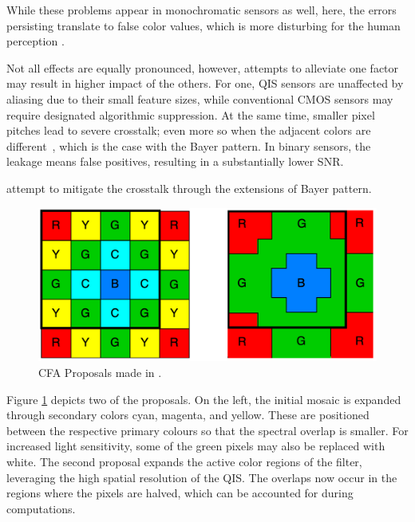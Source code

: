 While these problems appear in monochromatic sensors as well, here, the errors persisting translate to false color values, which is more disturbing for the human perception \cite{Hunt2005}.

Not all effects are equally pronounced, however, attempts to alleviate one factor may result in higher impact of the others. For one, QIS sensors are unaffected by aliasing due to their small feature sizes, while conventional CMOS sensors may require designated algorithmic suppression. At the same time, smaller pixel pitches lead to severe crosstalk; even more so when the adjacent colors are different~\cite{elgendy2019color}, which is the case with the Bayer pattern. In binary sensors, the leakage means false positives, resulting in a substantially lower SNR.

\cite{Anzagira2015ColorFA} attempt to mitigate the crosstalk through the extensions of Bayer pattern. 

\begin{figure}[h]
  \centering
  \includegraphics[width=0.7\linewidth]{imgs/cfaqis.png}
  \caption{CFA Proposals made in \cite{Anzagira2015ColorFA}.}
  \label{fig:cfaqis}
\end{figure}

Figure \ref{fig:cfaqis} depicts two of the proposals. On the left, the initial mosaic is expanded through secondary colors cyan, magenta, and yellow. These are positioned between the respective primary colours so that the spectral overlap is smaller. For increased light sensitivity, some of the green pixels may also be replaced with white. The second proposal expands the active color regions of the filter, leveraging the high spatial resolution of the QIS. The overlaps now occur in the regions where the pixels are halved, which can be accounted for during computations.


